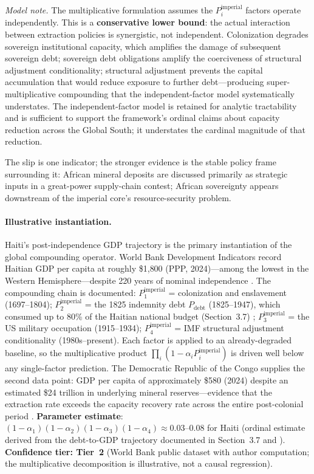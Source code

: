 \begin{itemize}
    \noindent\textit{Model note.} The multiplicative formulation assumes the $P_i^{\text{imperial}}$ factors operate independently. This is a \textbf{conservative lower bound}: the actual interaction between extraction policies is synergistic, not independent. Colonization degrades sovereign institutional capacity, which amplifies the damage of subsequent sovereign debt; sovereign debt obligations amplify the coerciveness of structural adjustment conditionality; structural adjustment prevents the capital accumulation that would reduce exposure to further debt---producing super-multiplicative compounding that the independent-factor model systematically understates. The independent-factor model is retained for analytic tractability and is sufficient to support the framework's ordinal claims about capacity reduction across the Global South; it understates the cardinal magnitude of that reduction.
\end{itemize}

The slip is one indicator; the stronger evidence is the stable policy frame surrounding it: African mineral deposits are discussed primarily as strategic inputs in a great-power supply-chain contest; African sovereignty appears downstream of the imperial core's resource-security problem.

\paragraph{Illustrative instantiation.}
Haiti's post-independence GDP trajectory is the primary instantiation of the global compounding operator. World Bank Development Indicators record Haitian GDP per capita at roughly \$1{,}800 (PPP, 2024)---among the lowest in the Western Hemisphere---despite 220 years of nominal independence \cite{world_bank_wdi}. The compounding chain is documented: $P_1^{\text{imperial}}$ = colonization and enslavement (1697--1804); $P_2^{\text{imperial}}$ = the 1825 indemnity debt $P_{\text{debt}}$ (1825--1947), which consumed up to 80\% of the Haitian national budget (Section~3.7) \cite{pigeaud}; $P_3^{\text{imperial}}$ = the US military occupation (1915--1934); $P_4^{\text{imperial}}$ = IMF structural adjustment conditionality (1980s--present). Each factor is applied to an already-degraded baseline, so the multiplicative product $\prod_i (1 - \alpha_i P_i^{\text{imperial}})$ is driven well below any single-factor prediction. The Democratic Republic of the Congo supplies the second data point: GDP per capita of approximately \$580 (2024) despite an estimated \$24 trillion in underlying mineral reserves---evidence that the extraction rate exceeds the capacity recovery rate across the entire post-colonial period \cite{world_bank_wdi, rodney}. \textbf{Parameter estimate}: $(1 - \alpha_1)(1 - \alpha_2)(1 - \alpha_3)(1 - \alpha_4) \approx 0.03\text{--}0.08$ for Haiti (ordinal estimate derived from the debt-to-GDP trajectory documented in Section~3.7 and \cite{pigeaud}). \textbf{Confidence tier: Tier~2} (World Bank public dataset with author computation; the multiplicative decomposition is illustrative, not a causal regression).

